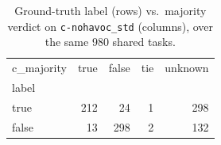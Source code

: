 \begin{table}[t]
  \centering
  \caption{Ground-truth label (rows) vs.\ majority verdict on \texttt{c-nohavoc_std} (columns), over the same 980 shared tasks.}
  \label{tab:label-majority-c-nohavoc_std}
\begin{tabular}{lrrrr}
\toprule
c_majority & true & false & tie & unknown \\
label &  &  &  &  \\
\midrule
true & 212 & 24 & 1 & 298 \\
false & 13 & 298 & 2 & 132 \\
\bottomrule
\end{tabular}
\end{table}
